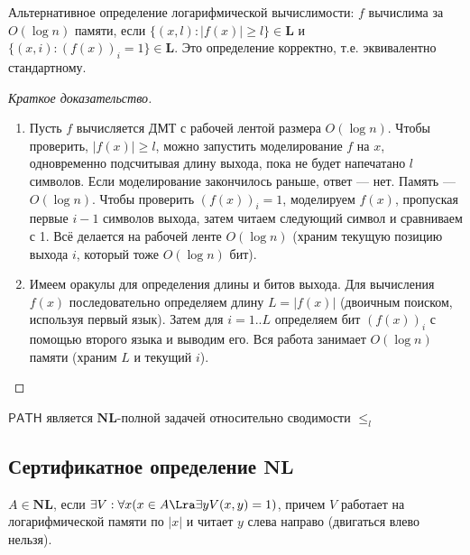 \begin{note}
    Альтернативное определение логарифмической вычислимости:  
    \(f\) вычислима за \(O(\log n)\) памяти, если  
    \(\{(x, l): |f(x)| \ge l\} \in \mathbf{L}\) и \(\{(x, i): (f(x))_i = 1\} \in \mathbf{L}\).  
    Это определение корректно, т.е. эквивалентно стандартному.
\end{note}
\begin{proof}[Краткое доказательство]
    \begin{enumerate}
        \item[\(\Rightarrow\)] Пусть \(f\) вычисляется ДМТ с рабочей лентой размера \(O(\log n)\).  
        Чтобы проверить, \(|f(x)| \ge l\), можно запустить моделирование \(f\) на \(x\), одновременно подсчитывая длину выхода, пока не будет напечатано \(l\) символов. Если моделирование закончилось раньше, ответ — нет. Память — \(O(\log n)\).  
        Чтобы проверить \((f(x))_i = 1\), моделируем \(f(x)\), пропуская первые \(i-1\) символов выхода, затем читаем следующий символ и сравниваем с 1. Всё делается на рабочей ленте \(O(\log n)\) (храним текущую позицию выхода \(i\), который тоже \(O(\log n)\) бит).  
        \item[\(\Leftarrow\)] Имеем оракулы для определения длины и битов выхода. Для вычисления \(f(x)\) последовательно определяем длину \(L = |f(x)|\) (двоичным поиском, используя первый язык). Затем для \(i = 1..L\) определяем бит \((f(x))_i\) с помощью второго языка и выводим его. Вся работа занимает \(O(\log n)\) памяти (храним \(L\) и текущий \(i\)).
    \end{enumerate}
\end{proof}

\begin{note}
    \(\mathsf{PATH}\) является \(\mathbf{NL}\)-полной задачей относительно сводимости \(\le_l\)
\end{note}


\subsection{Сертификатное определение \(\mathbf{NL}\)}

\begin{definition}
    \(A \in \mathbf{NL}\), если \(\exists V: \forall x (x \in A \Lra \exists yV(x, y) = 1)\), причем \(V\) работает на логарифмической памяти по \(|x|\) и читает \(y\) слева направо (двигаться влево нельзя).
\end{definition}

